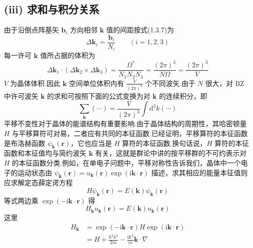 \subsection*{(iii) 求和与积分关系}

由于沿倒点阵基矢 $\boldsymbol{b}_i$ 方向相邻 $\boldsymbol{k}$ 值的间距按式(1.3.7)为
\begin{equation*}
  \Delta\boldsymbol{k}_i=\frac{\boldsymbol{b}_i}{N_i}\qquad(i=1,2,3)
\end{equation*}
每一许可 $\boldsymbol{k}$ 值所占据的体积为
\begin{equation*}
  \Delta\boldsymbol{k}_1\cdot(\Delta\boldsymbol{k}_2\times\Delta\boldsymbol{k}_3)
  =\frac{\Omega^{*}}{N_1N_2N_3}
  =\frac{(2\pi)^3}{N\Omega}
  =\frac{(2\pi)^3}{V}
\end{equation*}
$V$ 为晶体体积.因此 $\boldsymbol{k}$ 空间单位体积内有 $\frac{V}{(2\pi)^3}$ 个不同波矢.由于 $N$ 很大，对 BZ 中许可波矢 $\boldsymbol{k}$ 的求和可按照下面的公式变换为对 $\boldsymbol{k}$ 的连续积分，即
\begin{equation}
  \sum_{\boldsymbol{k}}\left(\cdots\right)
  =\frac{V}{(2\pi)^3}\int\mathrm{d}^3k\left(\cdots\right)
\end{equation}
平移不变性对于晶体的能谱结构有重要影响.由于晶体结构的周期性，其哈密顿量 $H$ 与平移算符可对易，二者应有共同的本征函数.已经证明，平移算符的本征函数是布洛赫函数 $\psi_{\boldsymbol{k}}(\boldsymbol{r})$，它也应当是 $H$ 算符的本征函数.换句话说，$H$ 算符的本征函数和本征值均与简约波矢 $\boldsymbol{k}$ 有关，这就是群论中讲的按平移群的不可约表示对 $H$ 的本征函数分类.例如，在单电子问题中，平移对称性告诉我们，晶体中一个电子的运动状态由 $\psi_{\boldsymbol{k}}(\boldsymbol{r})=u_{\boldsymbol{k}}(\boldsymbol{r})\exp(\mathrm{i}\boldsymbol{k}\cdot\boldsymbol{r})$ 描述，求其相应的能量本征值则应求解定态薛定谔方程
\begin{equation}
  H\psi_{\boldsymbol{k}}(\boldsymbol{r})=E(\boldsymbol{k})\psi_{\boldsymbol{k}}(\boldsymbol{r})
\end{equation}
等式两边乘 $\exp(-\mathrm{i}\boldsymbol{k}\cdot\boldsymbol{r})$ 得
\begin{equation}
  H_{\boldsymbol{k}}u_{\boldsymbol{k}}(\boldsymbol{r})
  =E(\boldsymbol{k})u_{\boldsymbol{k}}(\boldsymbol{r})
\end{equation}
这里
\begin{equation}
\begin{aligned}
  H_{\boldsymbol{k}}
  &=\exp(-\mathrm{i}\boldsymbol{k}\cdot\boldsymbol{r})H
  \exp(\mathrm{i}\boldsymbol{k}\cdot\boldsymbol{r})\\
  &=H+\frac{\hbar^2k^2}{2m}-\frac{\mathrm{i}\hbar^2}{m}\boldsymbol{k}\cdot\nabla
\end{aligned}
\end{equation}
